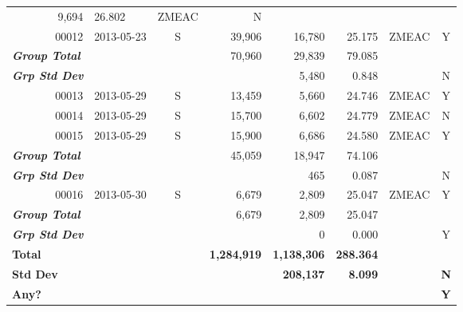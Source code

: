 \documentclass{article}
\begin{document}
\begin{center}
\begin{small}
\begin{longtable}{rlcrrrlc}
\color{Goldenrod1}9,694&
\color{Goldenrod1}26.802&
ZMEAC&
\color{red}N\\
\color{Goldenrod1}00012&
2013-05-23&
S&
\color{Goldenrod1}39,906&
\color{Goldenrod1}16,780&
\color{Goldenrod1}25.175&
ZMEAC&
\color{green}Y\\
\multicolumn{1}{l}{\bfseries{}\itshape{}\color{Tomato1}Group Total}&
&
&
\color{Goldenrod1}70,960&
\color{Goldenrod1}29,839&
\color{Goldenrod1}79.085&
&
\\
\multicolumn{1}{l}{\bfseries{}\itshape{}\color{Tomato1}Grp Std Dev}&
&
&
&
\color{Goldenrod1}5,480&
\color{Goldenrod1}0.848&
&
\color{red}N\\
\color{Goldenrod1}00013&
2013-05-29&
S&
\color{Goldenrod1}13,459&
\color{Goldenrod1}5,660&
\color{Goldenrod1}24.746&
ZMEAC&
\color{green}Y\\
\color{Goldenrod1}00014&
2013-05-29&
S&
\color{Goldenrod1}15,700&
\color{Goldenrod1}6,602&
\color{Goldenrod1}24.779&
ZMEAC&
\color{red}N\\
\color{Goldenrod1}00015&
2013-05-29&
S&
\color{Goldenrod1}15,900&
\color{Goldenrod1}6,686&
\color{Goldenrod1}24.580&
ZMEAC&
\color{green}Y\\
\multicolumn{1}{l}{\bfseries{}\itshape{}\color{Tomato1}Group Total}&
&
&
\color{Goldenrod1}45,059&
\color{Goldenrod1}18,947&
\color{Goldenrod1}74.106&
&
\\
\multicolumn{1}{l}{\bfseries{}\itshape{}\color{Tomato1}Grp Std Dev}&
&
&
&
\color{Goldenrod1}465&
\color{Goldenrod1}0.087&
&
\color{red}N\\
\color{Goldenrod1}00016&
2013-05-30&
S&
\color{Goldenrod1}6,679&
\color{Goldenrod1}2,809&
\color{Goldenrod1}25.047&
ZMEAC&
\color{green}Y\\
\multicolumn{1}{l}{\bfseries{}\itshape{}\color{Tomato1}Group Total}&
&
&
\color{Goldenrod1}6,679&
\color{Goldenrod1}2,809&
\color{Goldenrod1}25.047&
&
\\
\multicolumn{1}{l}{\bfseries{}\itshape{}\color{Tomato1}Grp Std Dev}&
&
&
&
\color{Goldenrod1}0&
\color{Goldenrod1}0.000&
&
\color{green}Y\\
\multicolumn{1}{l}{\bfseries{}\color{Blue2}Total}&
&
&
\bfseries{}\color{Goldenrod1}1,284,919&
\bfseries{}\color{Goldenrod1}1,138,306&
\bfseries{}\color{Goldenrod1}288.364&
&
\\
\multicolumn{1}{l}{\bfseries{}\color{Blue2}Std Dev}&
&
&
&
\bfseries{}\color{Goldenrod1}208,137&
\bfseries{}\color{Goldenrod1}8.099&
&
\bfseries{}\color{red}N\\
\multicolumn{1}{l}{\bfseries{}\color{Blue2}Any?}&
&
&
&
&
&
&
\bfseries{}\color{green}Y\\
\end{longtable}
\end{small}
\end{center}
\end{document}
